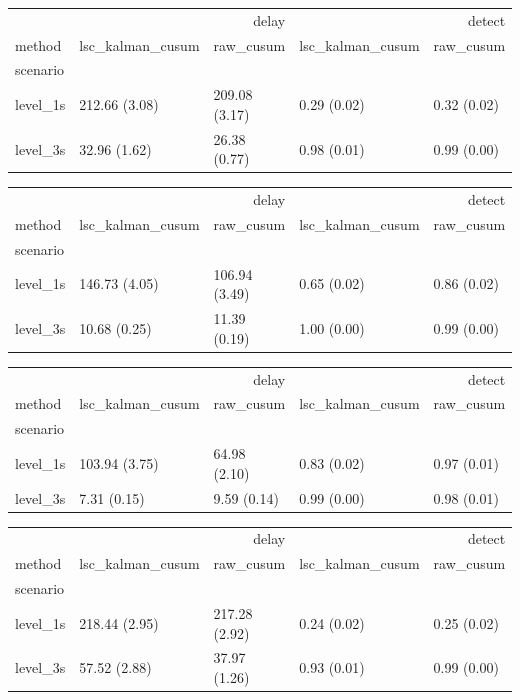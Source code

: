 \begin{tabular}{lllll}
\toprule
 & \multicolumn{2}{r}{delay} & \multicolumn{2}{r}{detect} \\
method & lsc_kalman_cusum & raw_cusum & lsc_kalman_cusum & raw_cusum \\
scenario &  &  &  &  \\
\midrule
level_1s & 212.66 (3.08) & 209.08 (3.17) & 0.29 (0.02) & 0.32 (0.02) \\
level_3s & 32.96 (1.62) & 26.38 (0.77) & 0.98 (0.01) & 0.99 (0.00) \\
\bottomrule
\end{tabular}

\begin{tabular}{lllll}
\toprule
 & \multicolumn{2}{r}{delay} & \multicolumn{2}{r}{detect} \\
method & lsc_kalman_cusum & raw_cusum & lsc_kalman_cusum & raw_cusum \\
scenario &  &  &  &  \\
\midrule
level_1s & 146.73 (4.05) & 106.94 (3.49) & 0.65 (0.02) & 0.86 (0.02) \\
level_3s & 10.68 (0.25) & 11.39 (0.19) & 1.00 (0.00) & 0.99 (0.00) \\
\bottomrule
\end{tabular}

\begin{tabular}{lllll}
\toprule
 & \multicolumn{2}{r}{delay} & \multicolumn{2}{r}{detect} \\
method & lsc_kalman_cusum & raw_cusum & lsc_kalman_cusum & raw_cusum \\
scenario &  &  &  &  \\
\midrule
level_1s & 103.94 (3.75) & 64.98 (2.10) & 0.83 (0.02) & 0.97 (0.01) \\
level_3s & 7.31 (0.15) & 9.59 (0.14) & 0.99 (0.00) & 0.98 (0.01) \\
\bottomrule
\end{tabular}

\begin{tabular}{lllll}
\toprule
 & \multicolumn{2}{r}{delay} & \multicolumn{2}{r}{detect} \\
method & lsc_kalman_cusum & raw_cusum & lsc_kalman_cusum & raw_cusum \\
scenario &  &  &  &  \\
\midrule
level_1s & 218.44 (2.95) & 217.28 (2.92) & 0.24 (0.02) & 0.25 (0.02) \\
level_3s & 57.52 (2.88) & 37.97 (1.26) & 0.93 (0.01) & 0.99 (0.00) \\
\bottomrule
\end{tabular}

